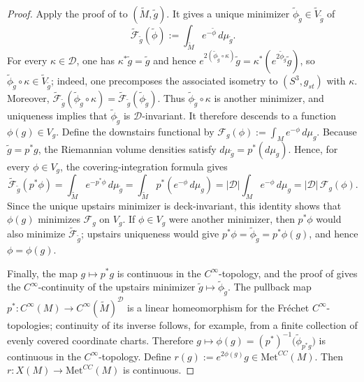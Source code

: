 \documentclass[12pt,oneside,a4paper]{article}
\theoremstyle{mytheorem}
\theoremstyle{remark}
\theoremstyle{definition}
\begin{document}
\begin{proof}
Apply the proof of \cite[Lemma~9.2(a)]{2019arXiv190908710B} to
$(\widetilde M,\widetilde g)$. It gives a unique minimizer
$\widetilde\phi_{\widetilde g}\in\widetilde V_{\widetilde g}$ of
\[
\widetilde{\mathcal F}_{\widetilde g}(\widetilde\phi)
:=
\int_{\widetilde M}e^{-\widetilde\phi}\,d\mu_{\widetilde g}.
\]
For every $\kappa\in\mathcal D$, one has $\kappa^*\widetilde g=\widetilde g$
and hence
\(e^{2(\widetilde\phi_{\widetilde g}\circ\kappa)}\widetilde g
=
\kappa^*\!\left(e^{2\widetilde\phi_{\widetilde g}}\widetilde g\right)\),
so
$\widetilde\phi_{\widetilde g}\circ\kappa
\in\widetilde V_{\widetilde g}$; indeed, one precomposes the associated
isometry to $(S^3,g_{st})$ with $\kappa$. Moreover,
\(\widetilde{\mathcal F}_{\widetilde g}
(\widetilde\phi_{\widetilde g}\circ\kappa)
=
\widetilde{\mathcal F}_{\widetilde g}(\widetilde\phi_{\widetilde g})\).
Thus $\widetilde\phi_{\widetilde g}\circ\kappa$ is another minimizer, and
uniqueness implies that $\widetilde\phi_{\widetilde g}$ is
$\mathcal D$-invariant. It therefore descends to a function
$\phi(g)\in V_g$. Define the downstairs functional by
\(\mathcal F_g(\phi):=\int_M e^{-\phi}\,d\mu_g\).
Because $\widetilde g=p^*g$, the Riemannian volume densities satisfy
$d\mu_{\widetilde g}=p^*(d\mu_g)$. Hence, for every $\phi\in V_g$, the
covering-integration formula gives
\[
\widetilde{\mathcal F}_{\widetilde g}(p^*\phi)
=
\int_{\widetilde M}e^{-p^*\phi}\,d\mu_{\widetilde g}
=
\int_{\widetilde M}p^*\!\left(e^{-\phi}\,d\mu_g\right)
=
|\mathcal D|\int_M e^{-\phi}\,d\mu_g
=
|\mathcal D|\,\mathcal F_g(\phi).
\]
Since the unique upstairs minimizer is deck-invariant, this identity shows
that $\phi(g)$ minimizes $\mathcal F_g$ on $V_g$. If $\phi\in V_g$ were
another minimizer, then $p^*\phi$ would also minimize
$\widetilde{\mathcal F}_{\widetilde g}$; upstairs uniqueness would give
$p^*\phi=\widetilde\phi_{\widetilde g}=p^*\phi(g)$, and hence
$\phi=\phi(g)$.

Finally, the map $g\mapsto p^*g$ is continuous in the
$C^\infty$-topology, and the proof of
\cite[Lemma~9.2(a)]{2019arXiv190908710B} gives the $C^\infty$-continuity of
the upstairs minimizer
$\widetilde g\mapsto\widetilde\phi_{\widetilde g}$. The pullback map
\(p^*\colon C^\infty(M)
\to C^\infty(\widetilde M)^{\mathcal D}\)
is a linear homeomorphism for the Fr\'echet $C^\infty$-topologies; continuity
of its inverse follows, for example, from a finite collection of evenly
covered coordinate charts. Therefore
\(g\longmapsto
\phi(g)
=
(p^*)^{-1}\!\bigl(\widetilde\phi_{p^*g}\bigr)\)
is continuous in the $C^\infty$-topology. Define
\(r(g):=e^{2\phi(g)}g\in \mathrm{Met}^{CC}(M)\).
Then $r\colon X(M)\to \mathrm{Met}^{CC}(M)$ is continuous.


\end{proof}
\end{document}
